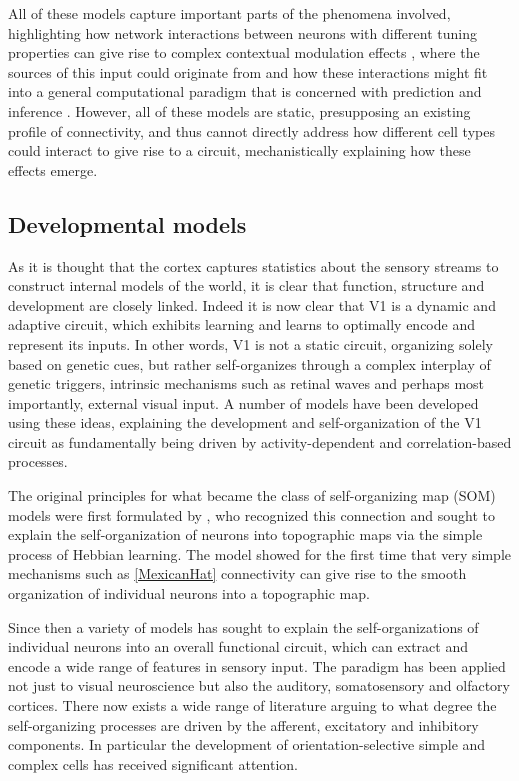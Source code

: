 All of these models capture important parts of the phenomena involved,
highlighting how network interactions between neurons with different
tuning properties can give rise to complex contextual modulation
effects \citep{Li2002}, where the sources of this input could
originate from \citep{Schwabe2006} and how these interactions might
fit into a general computational paradigm that is concerned with
prediction and inference \citep{Spratling2010, Coen2015}. However, all
of these models are static, presupposing an existing profile of
connectivity, and thus cannot directly address how different cell
types could interact to give rise to a circuit, mechanistically
explaining how these effects emerge.

\subsection{Developmental models} \label{devmodels}


As it is thought that the cortex captures statistics about the sensory
streams to construct internal models of the world, it is clear that
function, structure and development are closely linked. Indeed it is
now clear that V1 is a dynamic and adaptive circuit, which exhibits
learning and learns to optimally encode and represent its inputs. In
other words, V1 is not a static circuit, organizing solely based on
genetic cues, but rather self-organizes through a complex interplay of
genetic triggers, intrinsic mechanisms such as retinal waves and
perhaps most importantly, external visual input. A number of models
have been developed using these ideas, explaining the development and
self-organization of the V1 circuit as fundamentally being driven by
activity-dependent and correlation-based processes.

The original principles for what became the class of self-organizing
map (SOM) models were first formulated by \citep{VonderMalsburg1973},
who recognized this connection and sought to explain the
self-organization of neurons into topographic maps via the simple
process of Hebbian learning. The \cite{VonderMalsburg1973} model
showed for the first time that very simple mechanisms such as
\ref{MexicanHat} connectivity can give rise to the smooth organization
of individual neurons into a topographic map.

Since then a variety of models has sought to explain the
self-organizations of individual neurons into an overall functional
circuit, which can extract and encode a wide range of features in
sensory input. The paradigm has been applied not just to visual
neuroscience but also the auditory, somatosensory and olfactory
cortices. There now exists a wide range of literature arguing to what
degree the self-organizing processes are driven by the afferent,
excitatory and inhibitory components. In particular the development of
orientation-selective simple and complex cells has received
significant attention.

